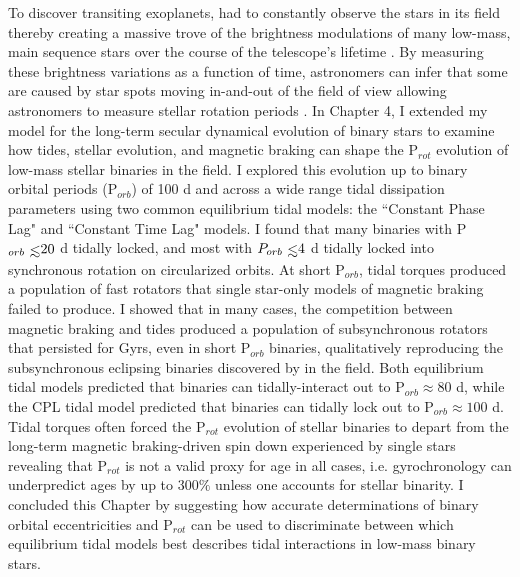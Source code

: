 To discover transiting exoplanets, \kepler had to constantly observe the stars in its field thereby creating a massive trove of the brightness modulations of many low-mass, main sequence stars over the course of the telescope's lifetime \citep{Borucki2003,Borucki2010}. By measuring these brightness variations as a function of time, astronomers can infer that some are caused by star spots moving in-and-out of the field of view allowing astronomers to measure stellar rotation periods \citep[P$_{rot}$, see][]{McQuillan2014}. In Chapter 4, I extended my model for the long-term secular dynamical evolution of binary stars to examine how tides, stellar evolution, and magnetic braking can shape the P$_{rot}$ evolution of low-mass stellar binaries in the \kepler field. I explored this evolution up to binary orbital periods (P$_{orb}$) of 100 d and across a wide range tidal dissipation parameters using two common equilibrium tidal models: the ``Constant Phase Lag" \citep[CPL,][]{FerrazMello2008} and ``Constant Time Lag" \citep[CTL,][]{Leconte2010} models. I found that many binaries with P$_{orb} \lsim 20$ d tidally locked, and most with $P_{orb} \lsim 4$ d tidally locked into synchronous rotation on circularized orbits. At short P$_{orb}$, tidal torques produced a population of fast rotators that single star-only models of magnetic braking failed to produce.  I showed that in many cases, the competition between magnetic braking and tides produced a population of subsynchronous rotators that persisted for Gyrs, even in short P$_{orb}$ binaries, qualitatively reproducing the subsynchronous eclipsing binaries discovered by \citet{Lurie2017} in the \kepler field. Both equilibrium tidal models predicted that binaries can tidally-interact out to P$_{orb} \approx 80$ d, while the CPL tidal model predicted that binaries can tidally lock out to P$_{orb} \approx 100$ d. Tidal torques often forced the P$_{rot}$ evolution of stellar binaries to depart from the long-term magnetic braking-driven spin down experienced by single stars revealing that P$_{rot}$ is not a valid proxy for age in all cases, i.e. gyrochronology can underpredict ages by up to $300\%$ unless one accounts for stellar binarity. I concluded this Chapter by suggesting how accurate determinations of binary orbital eccentricities and P$_{rot}$ can be used to discriminate between which equilibrium tidal models best describes tidal interactions in low-mass binary stars.
 

